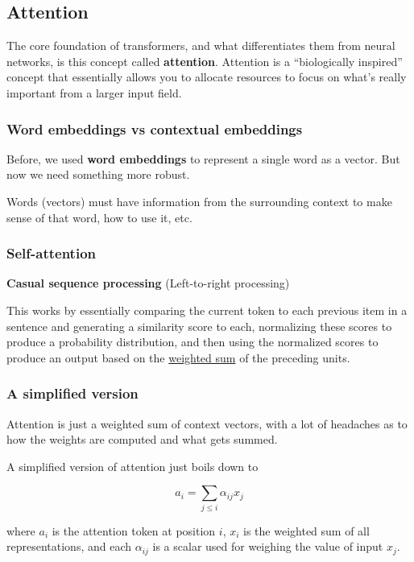 \documentclass[11pt]{article}
\begin{document}
\subsection{Attention}

The core foundation of transformers, and what differentiates them from neural networks, is this concept called \textbf{attention}. Attention is a ``biologically inspired'' concept that essentially allows you to allocate resources to focus on what's really important from a larger input field.

\subsubsection{Word embeddings vs contextual embeddings}

Before, we used \textbf{word embeddings} to represent a single word as a vector. But now we need something more robust.

Words (vectors) must have information from the surrounding context to make sense of that word, how to use it, etc.


\subsubsection{Self-attention}

\textbf{Casual sequence processing} (Left-to-right processing)

This works by essentially comparing the current token to each previous item in a sentence and generating a similarity score to each, normalizing these scores to produce a probability distribution, and then using the normalized scores to produce an output based on the \underline{weighted sum} of the preceding units.

\subsubsection*{A simplified version}

Attention is just a weighted sum of context vectors, with a lot of headaches as to how the weights are computed and what gets summed.

A simplified version of attention just boils down to

\begin{equation*}
	a_i = \sum_{j \le i} \alpha_{ij} x_j
\end{equation*}

where $a_i$ is the attention token at position $i$, $x_i$ is the weighted sum of all representations, and each $\alpha_{ij}$ is a scalar used for weighing the value of input $x_j$.
\end{document}
